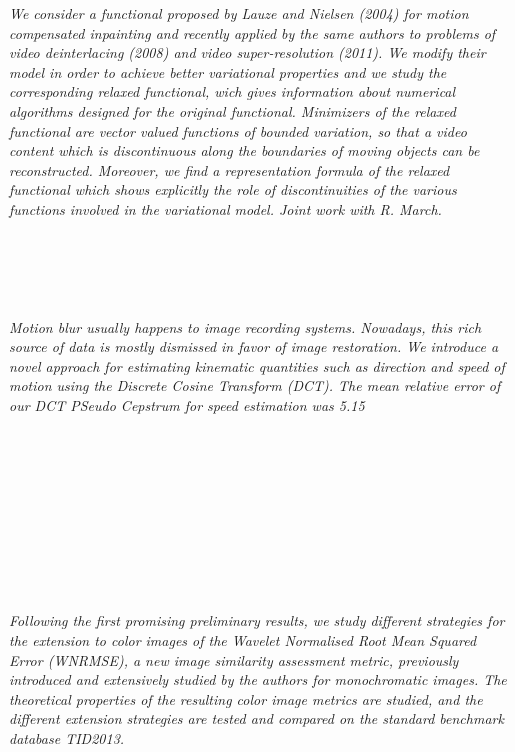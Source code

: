   \begin{multicols}{2}
      \textit{We consider a functional proposed by Lauze and Nielsen (2004) for motion compensated inpainting and recently applied by the same authors to problems of video deinterlacing (2008) and video super-resolution (2011). 
We modify their model in order to achieve better variational properties and we study the corresponding relaxed functional, wich gives information about numerical algorithms designed for the original functional.
Minimizers of the relaxed functional are vector valued functions of bounded variation, so that a video content which is discontinuous along the boundaries of moving objects can be reconstructed. Moreover, we find a representation formula of the relaxed functional which shows explicitly the role of discontinuities of the various functions involved in the variational model.
Joint work with R. March.}\\
\\ 
        \\
        \\\\
\\
      \textit{Motion blur usually happens to image recording systems. Nowadays, this rich source of data is mostly dismissed in favor of image restoration. We introduce a novel approach for estimating kinematic quantities such as direction and speed of motion using the Discrete Cosine Transform (DCT). The mean relative error of our DCT PSeudo Cepstrum for speed estimation was 5.15%
      }
\\ 
        \\
        \\\\
        \\
        \\\\
        \\
        \\\\
\\
      \textit{Following the first promising preliminary results, we study different strategies for the extension to color images of the Wavelet Normalised Root Mean Squared Error (WNRMSE), a new image similarity assessment metric, previously introduced and extensively studied by the authors for monochromatic images. The theoretical properties of the resulting color image metrics are studied, and the different extension strategies are tested and compared on the standard benchmark database TID2013. }\\

\end{multicols}
